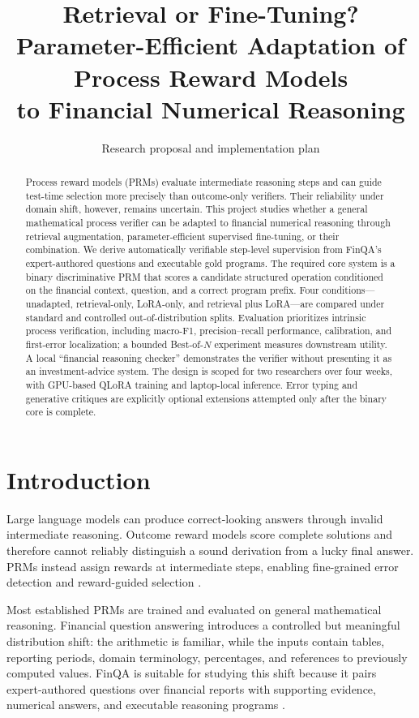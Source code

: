 \documentclass[10pt,twocolumn]{article}
\title{\textbf{Retrieval or Fine-Tuning?}\\
Parameter-Efficient Adaptation of Process Reward Models\\
to Financial Numerical Reasoning}
\author{\todoauthor}
\date{Research proposal and implementation plan}
\begin{document}
\maketitle

\begin{abstract}
Process reward models (PRMs) evaluate intermediate reasoning steps and can guide test-time selection more precisely than outcome-only verifiers. Their reliability under domain shift, however, remains uncertain. This project studies whether a general mathematical process verifier can be adapted to financial numerical reasoning through retrieval augmentation, parameter-efficient supervised fine-tuning, or their combination. We derive automatically verifiable step-level supervision from FinQA's expert-authored questions and executable gold programs. The required core system is a binary discriminative PRM that scores a candidate structured operation conditioned on the financial context, question, and a correct program prefix. Four conditions---unadapted, retrieval-only, LoRA-only, and retrieval plus LoRA---are compared under standard and controlled out-of-distribution splits. Evaluation prioritizes intrinsic process verification, including macro-F1, precision--recall performance, calibration, and first-error localization; a bounded Best-of-$N$ experiment measures downstream utility. A local ``financial reasoning checker'' demonstrates the verifier without presenting it as an investment-advice system. The design is scoped for two researchers over four weeks, with GPU-based QLoRA training and laptop-local inference. Error typing and generative critiques are explicitly optional extensions attempted only after the binary core is complete.
\end{abstract}

\section{Introduction}
Large language models can produce correct-looking answers through invalid intermediate reasoning. Outcome reward models score complete solutions and therefore cannot reliably distinguish a sound derivation from a lucky final answer. PRMs instead assign rewards at intermediate steps, enabling fine-grained error detection and reward-guided selection \citep{lightman2023lets,mathshepherd2024}.

Most established PRMs are trained and evaluated on general mathematical reasoning. Financial question answering introduces a controlled but meaningful distribution shift: the arithmetic is familiar, while the inputs contain tables, reporting periods, domain terminology, percentages, and references to previously computed values. FinQA is suitable for studying this shift because it pairs expert-authored questions over financial reports with supporting evidence, numerical answers, and executable reasoning programs \citep{finqa2021}.
\end{document}
